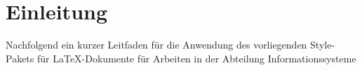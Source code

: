 \chapter{Einleitung} 
Nachfolgend ein kurzer Leitfaden f\"{u}r die Anwendung des
vorliegenden Style-Pakets f\"{u}r LaTeX-Dokumente f\"{u}r Arbeiten in der
Abteilung Informationssysteme